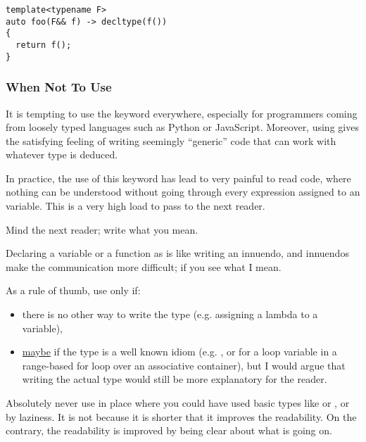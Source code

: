 \begin{lstlisting}
template<typename F>
auto foo(F&& f) -> decltype(f())
{
  return f();
}
\end{lstlisting}

\subsubsection{When Not To Use }

It is tempting to use the  keyword everywhere, especially
for programmers coming from loosely typed languages such as Python or
JavaScript. Moreover, using  gives the satisfying feeling
of writing seemingly ``generic'' code that can work with whatever type
is deduced.

In practice, the use of this keyword has lead to very painful to read
code, where nothing can be understood without going through every
expression assigned to an  variable. This is a very high
load to pass to the next reader.

\begin{guideline}
Mind the next reader; write what you mean.
  
Declaring a variable or a function as  is like writing an
innuendo, and innuendos make the communication more difficult; if you
see what I mean.

As a rule of thumb, use  only if:
\begin{itemize}
\item there is no other way to write the type (e.g. assigning a
  lambda to a variable),
\item \underline{maybe} if the type is a well known idiom (e.g. , or for a loop variable in a range-based for
  loop over an associative container), but I would argue that writing
  the actual type would still be more explanatory for the reader.
\end{itemize}

Absolutely never use  in place where you could have used
basic types like  or , or by laziness. It is not
because it is shorter that it improves the readability. On the
contrary, the readability is improved by being clear about what is
going on.
\end{guideline}
